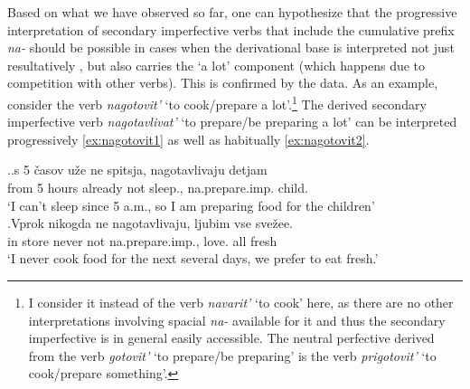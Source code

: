 Based on what we have observed so far, one can hypothesize that the progressive interpretation  of secondary imperfective  verbs  that include the cumulative  prefix \textit{na-}   should be possible in cases when the derivational base is interpreted not just resultatively , but also carries the `a lot' component (which happens due to competition with other verbs). This is confirmed by the data. As an example, consider the verb \textit{nagotovit'} `to cook/prepare a lot'.\footnote{I consider it instead of the verb \textit{navarit'} `to cook' here, as there are no other interpretations involving spacial \textit{na-}   available for it and thus the secondary imperfective  is in general easily accessible. The neutral perfective   derived from the verb \textit{gotovit'} `to prepare/be preparing' is the verb \textit{prigotovit'} `to cook/prepare something'.}  The derived secondary imperfective  verb  \textit{nagotavlivat'} `to prepare/be preparing a lot' can be interpreted progressively \ref{ex:nagotovit1} as well as habitually \ref{ex:nagotovit2}.

\ex.\label{ex:nagotovit}\ag.\label{ex:nagotovit1}s 5 \v{c}asov u\v{z}e ne spitsja, nagotavlivaju detjam\\
from 5 hours already not sleep., na.prepare.imp. child.\\
\trans `I can't sleep since 5 a.m., so I am preparing food for the children'\\
\bg.\label{ex:nagotovit2}Vprok nikogda ne nagotavlivaju, ljubim vse sve\v{z}ee.\\
{in store} never not na.prepare.imp., love. all fresh\\
\trans `I never cook food for the next several days, we prefer to eat fresh.'\\

